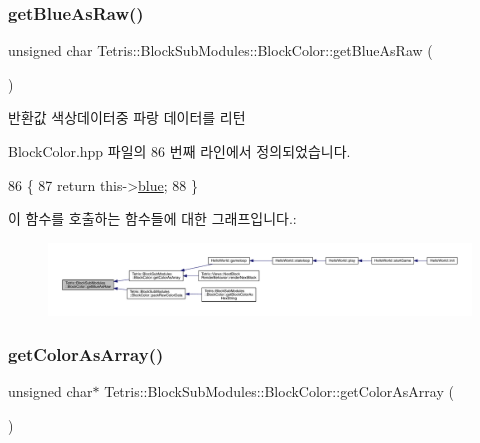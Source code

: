 \subsubsection{\texorpdfstring{get\+Blue\+As\+Raw()}{getBlueAsRaw()}}
{\footnotesize\ttfamily unsigned char Tetris\+::\+Block\+Sub\+Modules\+::\+Block\+Color\+::get\+Blue\+As\+Raw (\begin{DoxyParamCaption}{ }\end{DoxyParamCaption})\hspace{0.3cm}{\ttfamily [inline]}}

\begin{DoxyReturn}{반환값}
색상데이터중 파랑 데이터를 리턴 
\end{DoxyReturn}


Block\+Color.\+hpp 파일의 86 번째 라인에서 정의되었습니다.


\begin{DoxyCode}
86                                         \{
87                 \textcolor{keywordflow}{return} this->\hyperlink{class_tetris_1_1_block_sub_modules_1_1_block_color_af04e78b9a1c2f7625863c289c4a741e3}{blue};
88             \}
\end{DoxyCode}
이 함수를 호출하는 함수들에 대한 그래프입니다.\+:
\nopagebreak
\begin{figure}[H]
\begin{center}
\leavevmode
\includegraphics[width=350pt]{de/d44/class_tetris_1_1_block_sub_modules_1_1_block_color_ac0ad44a8b001f3824447d137357f5145_icgraph}
\end{center}
\end{figure}
\mbox{\label{class_tetris_1_1_block_sub_modules_1_1_block_color_ac626961ee3894d89a7fc961e9f40c92f}} 
\subsubsection{\texorpdfstring{get\+Color\+As\+Array()}{getColorAsArray()}}
{\footnotesize\ttfamily unsigned char$\ast$ Tetris\+::\+Block\+Sub\+Modules\+::\+Block\+Color\+::get\+Color\+As\+Array (\begin{DoxyParamCaption}{ }\end{DoxyParamCaption})\hspace{0.3cm}{\ttfamily [inline]}}

